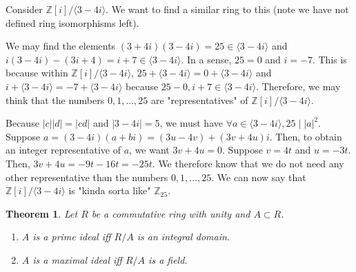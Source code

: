 \documentclass{article}
\theoremstyle{definition}
\theoremstyle{plain}
\newtheorem{theorem}{Theorem}
\theoremstyle{corollary}
\theoremstyle{lemma}
\begin{document}
Consider $\mathbb{Z}[i]/\langle3-4i\rangle$. We want to find a similar ring to this (note we have not defined ring isomorphisms left).

We may find the elements $(3+4i)(3-4i)=25\in\langle3-4i\rangle$ and $i(3-4i)-(3i+4)=i+7\in\langle3-4i\rangle$. In a sense, $25=0$ and $i=-7$. This is because within $\mathbb{Z}[i]/\langle3-4i\rangle$, $25+\langle3-4i\rangle=0+\langle3-4i\rangle$ and $i+\langle3-4i\rangle=-7+\langle3-4i\rangle$ because $25-0,i+7\in\langle3-4i\rangle$. Therefore, we may think that the numbers $0,1,...,25$ are "representatives" of $\mathbb{Z}[i]/\langle3-4i\rangle$.

Because $|c||d|=|cd|$ and $|3-4i|=5$, we must have $\forall a\in\langle3-4i\rangle,25\mid|a|^2$. Suppose $a=(3-4i)(a+bi)=(3u-4v)+(3v+4u)i$. Then, to obtain an integer representative of $a$, we want $3v+4u=0$. Suppose $v=4t$ and $u=-3t$. Then, $3v+4u=-9t-16t=-25t$. We therefore know that we do not need any other representative than the numbers $0,1,...,25$. We can now say that $\mathbb{Z}[i]/\langle3-4i\rangle$ is "kinda sorta like" $\mathbb{Z}_{25}$.

\begin{theorem}
    Let $R$ be a commutative ring with unity and $A\subset R$.
    \begin{enumerate}
        \item $A$ is a prime ideal iff $R/A$ is an integral domain.
        \item $A$ is a maximal ideal iff $R/A$ is a field.
    \end{enumerate}
\end{theorem}
\end{document}
